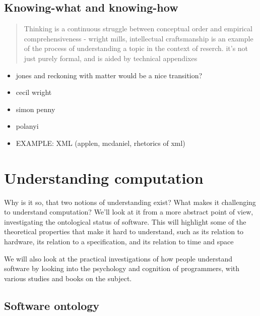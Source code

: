 \subsection{Knowing-what and knowing-how} %


\begin{quote}
    Thinking is a continuous struggle between conceptual order and empirical comprehensiveness - wright mills, intellectual craftsmanship is an example of the process of understanding a topic in the context of reserch. it's not just purely formal, and is aided by technical appendixes
\end{quote}

\begin{itemize}
    \item jones and reckoning with matter would be a nice transition?
    \item cecil wright
    \item simon penny
    \item polanyi
    \item EXAMPLE: XML (applen, mcdaniel, rhetorics of xml)
\end{itemize}

\section{Understanding computation}

Why is it so, that two notions of understanding exist? What makes it challenging to understand computation? We'll look at it from a more abstract point of view, investigating the ontological status of software. This will highlight some of the theoretical properties that make it hard to understand, such as its relation to hardware, its relation to a specification, and its relation to time and space

We will also look at the practical investigations of how people understand software by looking into the psychology and cognition of programmers, with various studies and books on the subject.


\subsection{Software ontology}

